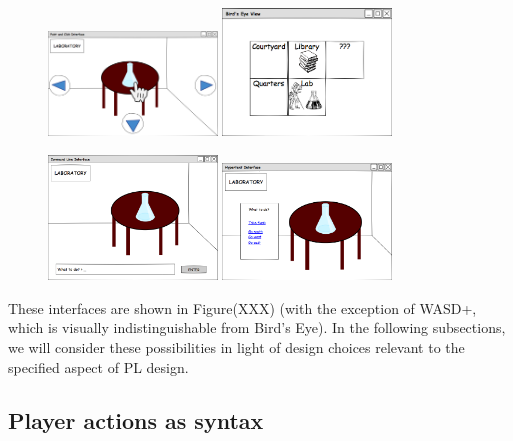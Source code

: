   \begin{figure}
    \includegraphics[width=0.4\textwidth]{../uis/point-and-click.png}
    \includegraphics[width=0.4\textwidth]{../uis/birds-eye-view.png}

    \includegraphics[width=0.4\textwidth]{../uis/parser.png}
    \includegraphics[width=0.4\textwidth]{../uis/hypertext.png}
  \end{figure}

  These interfaces are shown in Figure(XXX) (with the exception of WASD+,
  which is visually indistinguishable from Bird's Eye).
  In the following subsections, we will consider these possibilities in
  light of design choices relevant to the specified aspect of PL design.

  \subsection{Player actions as syntax}

